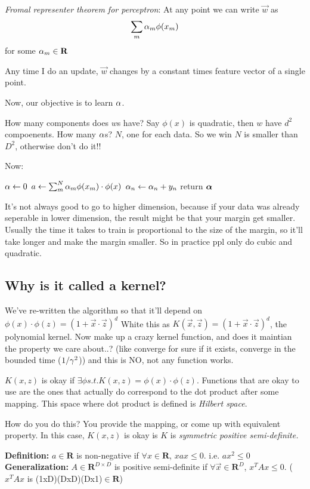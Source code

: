 \emph{Fromal representer theorem for perceptron}: At any point we can
write $\vec w$ as $$\sum_m \alpha_m\phi(x_m)$$ for some $\alpha_m\in
\mathbf{R}$

Any time I do an update, $\vec w$ changes by a constant times feature
vector of a single point.

Now, our objective is to learn $\alpha$.

How many components does $w$s have? Say $\phi(x)$ is quadratic, then
$w$ have $d^2$ compoenents. How many $\alpha$s? $N$, one for each
data. So we win $N$ is smaller than $D^2$, otherwise don't do it!!

Now:
\begin{algorithmic}
\STATE $\alpha \gets 0$
   \STATE $a \gets \sum_m^N\alpha_m\phi(x_m) \cdot \phi(x)$
            \STATE $\alpha_n \gets \alpha_n + y_n$
   \ENDIF
\ENDFOR
\STATE return $\boldsymbol{\alpha}$
\end{algorithmic}

It's not always good to go to higher dimension, because if your data
was already seperable in lower dimension, the result might be that
your margin get smaller. Usually the time it takes to train is
proportional to the size of the margin, so it'll take longer and make
the margin smaller. So in practice ppl only do cubic and quadratic.

\subsection{Why is it called a kernel?}
\label{sec:kernel}
We've re-written the algorithm so that it'll depend on $\phi(x)\cdot
\phi(z) = (1+\vec x \cdot \vec z)^d$
White this as $K(\vec x,\vec z) = (1+\vec x \cdot \vec z)^d$, the polynomial kernel.
Now make up a crazy kernel function, and does it maintian the property
we care about..? (like converge for sure if it exists, converge in the
bounded time ($1/\gamma^2$)) and this is NO, not any function works.

$K(x,z)$ is okay if $\exists \phi s.t. K(x,z) = \phi(x)\cdot \phi(z)$.
Functions that are okay to use are the ones that actually do
correspond to the dot product after some mapping.
This space where dot product is defined is \emph{Hilbert space}.

How do you do this? You provide the mapping, or come up with
equivalent property. In this case, $K(x,z)$ is okay is $K$ is
\emph{symmetric positive
semi-definite.}

\textbf{Definition:} $a \in \mathbf{R}$ is non-negative if $\forall x\in
\mathbf{R}$, $xax \le 0$. i.e. $ax^2 \le 0$
\textbf{Generalization:} $A \in \mathbf{R}^{D\times D}$ is positive semi-definite if
$\forall \vec x \in
\mathbf{R}^D$, $x^TAx \le 0$. ($x^TAx$ is (1xD)(DxD)(Dx1)$\in \mathbf{R}$)

